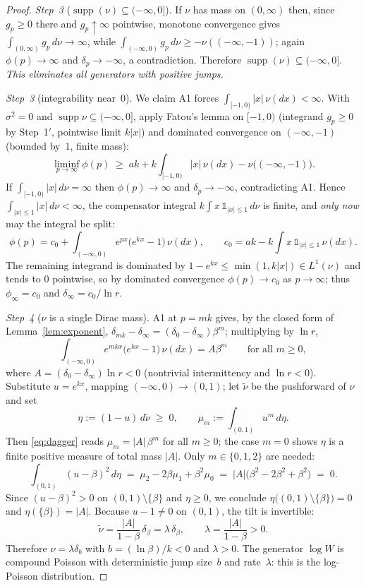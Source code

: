 \documentclass[pdflatex,sn-mathphys-num]{sn-jnl}
\theoremstyle{thmstyleone}
\theoremstyle{thmstyletwo}
\theoremstyle{thmstylethree}
\DeclareMathOperator{\supp}{supp}
\begin{document}
\begin{proof}
\textit{Step~3} ($\supp(\nu) \subseteq (-\infty,0]$).  If $\nu$ has
mass on $(0,\infty)$ then, since $g_p \ge 0$ there and $g_p \uparrow
\infty$ pointwise, monotone convergence gives $\int_{(0,\infty)}
g_p\,d\nu \to \infty$, while $\int_{(-\infty,0)} g_p\,d\nu \ge
-\nu((-\infty,-1))$; again $\phi(p) \to \infty$ and $\delta_p \to
-\infty$, a contradiction.  Therefore $\supp(\nu) \subseteq
(-\infty,0]$.  \textit{This eliminates all generators with positive
jumps.}

\textit{Step~3\textonehalf} (integrability near~$0$).  We claim A1
forces $\int_{[-1,0)} |x|\,\nu(dx) < \infty$.  With $\sigma^2 = 0$
and $\supp\nu \subseteq (-\infty,0]$, apply Fatou's lemma on
$[-1,0)$ (integrand $g_p \ge 0$ by Step~1$'$, pointwise limit
$k|x|$) and dominated convergence on $(-\infty,-1)$ (bounded by~$1$,
finite mass):
\[
  \liminf_{p\to\infty} \phi(p)
  \;\ge\; ak + k\int_{[-1,0)} |x|\,\nu(dx)
  - \nu\bigl((-\infty,-1)\bigr).
\]
If $\int_{[-1,0)}|x|\,d\nu = \infty$ then $\phi(p) \to \infty$ and
$\delta_p \to -\infty$, contradicting A1.  Hence
$\int_{|x|\le1}|x|\,d\nu < \infty$, the compensator integral
$k\int x\,\mathds{1}_{|x|\le1}\,d\nu$ is finite, and \emph{only now}
may the integral be split:
\[
  \phi(p) = c_0 + \int_{(-\infty,0)} e^{px}\bigl(e^{kx}-1\bigr)
  \,\nu(dx),
  \qquad
  c_0 = ak - k\!\int x\,\mathds{1}_{|x|\leq 1}\,\nu(dx).
\]
The remaining integrand is dominated by $1 - e^{kx} \le
\min(1, k|x|) \in L^1(\nu)$ and tends to $0$ pointwise, so by
dominated convergence $\phi(p) \to c_0$ as $p \to \infty$; thus
$\phi_\infty = c_0$ and $\delta_\infty = c_0/\ln r$.

\textit{Step~4} ($\nu$ is a single Dirac mass).  A1 at $p = mk$
gives, by the closed form of Lemma~\ref{lem:exponent},
$\delta_{mk} - \delta_\infty = (\delta_0-\delta_\infty)\beta^m$;
multiplying by $\ln r$,
\begin{equation}\label{eq:dagger}
  \int_{(-\infty,0)} e^{mkx}\bigl(e^{kx}-1\bigr)\,\nu(dx)
  = A\beta^m
  \qquad\text{for all } m \geq 0,
\end{equation}
where $A = (\delta_0 - \delta_\infty)\ln r < 0$ (nontrivial
intermittency and $\ln r < 0$).  Substitute $u = e^{kx}$, mapping
$(-\infty,0) \to (0,1)$; let $\tilde\nu$ be the pushforward of $\nu$
and set
\[
  \eta := (1-u)\,d\tilde\nu \;\ge\; 0,
  \qquad
  \mu_m := \int_{(0,1)} u^m \, d\eta .
\]
Then \eqref{eq:dagger} reads $\mu_m = |A|\,\beta^m$ for all $m \ge
0$; the case $m=0$ shows $\eta$ is a finite positive measure of
total mass $|A|$.  Only $m \in \{0,1,2\}$ are needed:
\[
  \int_{(0,1)} (u-\beta)^2 \, d\eta
  \;=\; \mu_2 - 2\beta\mu_1 + \beta^2\mu_0
  \;=\; |A|\bigl(\beta^2 - 2\beta^2 + \beta^2\bigr)
  \;=\; 0 .
\]
Since $(u-\beta)^2 > 0$ on $(0,1)\setminus\{\beta\}$ and $\eta \ge
0$, we conclude $\eta\bigl((0,1)\setminus\{\beta\}\bigr) = 0$ and
$\eta(\{\beta\}) = |A|$.  Because $u - 1 \neq 0$ on $(0,1)$, the
tilt is invertible:
\[
  \tilde\nu = \frac{|A|}{1-\beta}\,\delta_\beta
  = \lambda\,\delta_\beta,
  \qquad \lambda = \frac{|A|}{1-\beta} > 0 .
\]
Therefore $\nu = \lambda\delta_b$ with $b = (\ln\beta)/k < 0$ and
$\lambda > 0$.  The generator $\log W$ is compound Poisson with
deterministic jump size~$b$ and rate~$\lambda$: this is the
log-Poisson distribution.
\end{proof}
\end{document}
